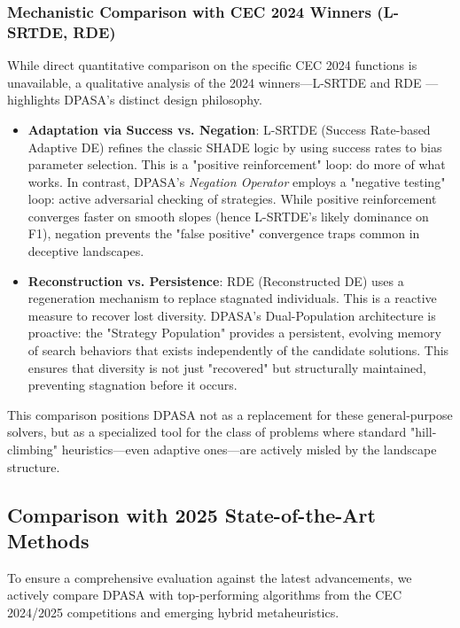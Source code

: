 \documentclass[11pt]{article}
\begin{document}
\subsubsection{Mechanistic Comparison with CEC 2024 Winners (L-SRTDE, RDE)}
While direct quantitative comparison on the specific CEC 2024 functions is unavailable, a qualitative analysis of the 2024 winners---L-SRTDE \citep{stanovov2024lsrtde} and RDE \citep{tao2024rde}---highlights DPASA's distinct design philosophy.

\begin{itemize}
    \item \textbf{Adaptation via Success vs. Negation}: L-SRTDE (Success Rate-based Adaptive DE) refines the classic SHADE logic by using success rates to bias parameter selection. This is a "positive reinforcement" loop: do more of what works. In contrast, DPASA's \textit{Negation Operator} employs a "negative testing" loop: active adversarial checking of strategies. While positive reinforcement converges faster on smooth slopes (hence L-SRTDE's likely dominance on F1), negation prevents the "false positive" convergence traps common in deceptive landscapes.
    
    \item \textbf{Reconstruction vs. Persistence}: RDE (Reconstructed DE) uses a regeneration mechanism to replace stagnated individuals. This is a reactive measure to recover lost diversity. DPASA's Dual-Population architecture is proactive: the "Strategy Population" provides a persistent, evolving memory of search behaviors that exists independently of the candidate solutions. This ensures that diversity is not just "recovered" but structurally maintained, preventing stagnation before it occurs.
\end{itemize}

This comparison positions DPASA not as a replacement for these general-purpose solvers, but as a specialized tool for the class of problems where standard "hill-climbing" heuristics---even adaptive ones---are actively misled by the landscape structure.


\subsection{Comparison with 2025 State-of-the-Art Methods}
\label{sec:sota_2025}

To ensure a comprehensive evaluation against the latest advancements, we actively compare DPASA with top-performing algorithms from the CEC 2024/2025 competitions and emerging hybrid metaheuristics.
\end{document}

